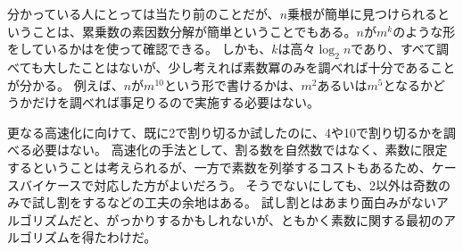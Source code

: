 
分かっている人にとっては当たり前のことだが、$n$乗根が簡単に見つけられるということは、累乗数の素因数分解が簡単ということでもある。$n$が$m^k$のような形をしているかはを使って確認できる。
しかも、$k$は高々$\log_2{n}$であり、すべて調べても大したことはないが、少し考えれば素数冪のみを調べれば十分であることが分かる。
例えば、$n$が$m^{10}$という形で書けるかは、$m^2$あるいは$m^5$となるかどうかだけを調べれば事足りるので実施する必要はない。


更なる高速化に向けて、既に2で割り切るか試したのに、4や10で割り切るかを調べる必要はない。
高速化の手法として、割る数を自然数ではなく、素数に限定するということは考えられるが、一方で素数を列挙するコストもあるため、ケースバイケースで対応した方がよいだろう。
そうでないにしても、2以外は奇数のみで試し割をするなどの工夫の余地はある。
試し割とはあまり面白みがないアルゴリズムだと、がっかりするかもしれないが、ともかく素数に関する最初のアルゴリズムを得たわけだ。

